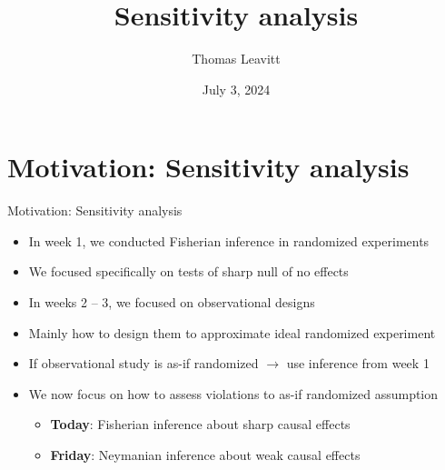 \documentclass[table, xcolor={dvipsnames}, 9pt]{beamer}
\title[]{Sensitivity analysis} %
\author{Thomas Leavitt} %
\institute[] %
{
\medskip
\textit{} %
}
\date{July 3, 2024} %
\theoremstyle{newstyle}
\begin{document}
\begin{frame}
\titlepage %
\end{frame}


\section{Motivation: Sensitivity analysis}
\begin{frame}{Motivation: Sensitivity analysis}
\vfill
\begin{itemize} \vfill
\item In week 1, we conducted Fisherian inference in randomized experiments \vfill
\item[] We focused specifically on tests of sharp null of no effects \vfill
\item In weeks 2 -- 3, we focused on observational designs \vfill
\item[] Mainly how to design them to approximate ideal randomized experiment \vfill
\item[] If observational study is as-if randomized $\rightarrow$ use inference from week 1 \vfill
\item We now focus on how to assess violations to as-if randomized assumption \vfill
\begin{itemize} \vfill
\item \textbf{Today}: Fisherian inference about sharp causal effects \vfill
\item \textbf{Friday}: Neymanian inference about weak causal effects \vfill
\end{itemize} \vfill
\end{itemize} \vfill
\end{frame}
\end{document}
